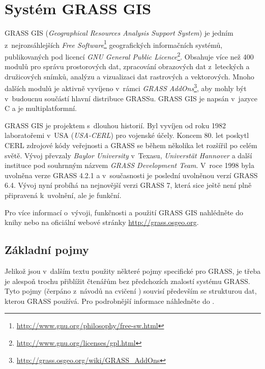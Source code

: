 \documentclass[a4paper,12pt,draft]{article}
\newif\ifbc %
\begin{document}
\section{Systém GRASS GIS}
\label{sec:grass}
GRASS GIS (\emph{Geographical Resources Analysis Support
System}) je jedním z~nejrozsáhlejších \emph{Free
Software}\footnote{\url{http://www.gnu.org/philosophy/free-sw.html}}
geografických informačních systémů,
publikovaných pod licencí \emph{GNU General Public
Licence}\footnote{\url{http://www.gnu.org/licenses/gpl.html}}. Obsahuje více
než 400 modulů pro správu prostorových dat, zpracování obrazových dat
z~leteckých a družicových snímků, analýzu a vizualizaci dat rastrových
a vektorových. Mnoho dalších modulů je aktivně vyvíjeno v~rámci \emph{GRASS
AddOns}\footnote{\url{http://grass.osgeo.org/wiki/GRASS_AddOns}}, aby mohly být
v~budoucnu součástí hlavní distribuce GRASSu. GRASS GIS je napsán v~jazyce C a
je multiplatformní.

GRASS GIS je projektem s~dlouhou historií. Byl vyvíjen od roku
1982 laboratořemi v~USA (\emph{USA-CERL}) pro vojenské účely. Koncem
80. let poskytl CERL zdrojové kódy veřejnosti a GRASS se během několika
let rozšířil po celém světě. Vývoj převzaly \emph{Baylor University}
v~Texasu, \emph{Universtät Hannover} a další instituce pod souhrnným názvem
\emph{GRASS Development Team}. V~roce 1998 byla uvolněna verze GRASS
4.2.1 a v~současnosti je poslední uvolněnou verzí GRASS 6.4. Vývoj
nyní probíhá na nejnovější verzi GRASS 7, která sice ještě není plně
připravená k~uvolnění, ale je funkční.

Pro více informací o~vývoji, funkčnosti a použití GRASS GIS nahlédněte
do knihy \cite{grass_gis} nebo na oficiální webové stránky
\url{http://grass.osgeo.org}.
\ifbc
Postup instalace pro operační systém \emph{Linux}, distribuci \emph{Debian} a
\emph{Ubuntu} lze najít v~příloze \ref{priloha:instalace} nebo detailněji na
stránkách \cite{instalace}.
\fi

\subsection{Základní pojmy}
\label{sec:grass:pojmy}
Jelikož jsou v~dalším textu použity některé pojmy specifické pro GRASS,
je třeba je alespoň trochu přiblížit čtenářům bez předchozích
znalostí systému GRASS. Tyto pojmy
(čerpáno z~návodů na cvičení \cite{YZOD}) souvisí především se strukturou dat,
kterou GRASS používá. Pro podrobnější informace náhledněte do \cite{grass_gis}.
\end{document}
